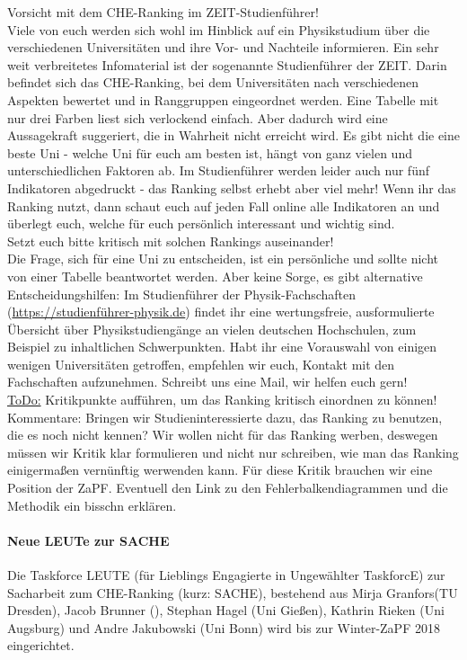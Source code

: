       Vorsicht mit dem CHE-Ranking im ZEIT-Studienführer! \\
      Viele von euch werden sich wohl im Hinblick auf ein Physikstudium über die verschiedenen Universitäten und ihre Vor- und Nachteile informieren. Ein sehr weit verbreitetes Infomaterial ist der sogenannte Studienführer der ZEIT. Darin befindet sich das CHE-Ranking, bei dem Universitäten nach verschiedenen Aspekten bewertet und in Ranggruppen eingeordnet werden.
      Eine Tabelle mit nur drei Farben liest sich verlockend einfach. Aber dadurch wird eine Aussagekraft suggeriert, die in Wahrheit nicht erreicht wird.
      Es gibt nicht die eine beste Uni -  welche Uni für euch am besten ist, hängt von ganz vielen und unterschiedlichen Faktoren ab.
      Im Studienführer werden leider auch nur fünf Indikatoren abgedruckt - das Ranking selbst erhebt aber viel mehr! Wenn ihr das Ranking nutzt, dann schaut euch auf jeden Fall online alle Indikatoren an und überlegt euch, welche für euch persönlich interessant und wichtig sind. \\

      Setzt euch bitte kritisch mit solchen Rankings auseinander! \\

      Die Frage, sich für eine Uni zu entscheiden, ist ein persönliche und sollte nicht von einer Tabelle beantwortet werden. Aber keine Sorge, es gibt alternative Entscheidungshilfen: Im Studienführer der Physik-Fachschaften (\url{https://studienführer-physik.de}) findet ihr eine wertungsfreie, ausformulierte Übersicht über Physikstudiengänge an vielen deutschen Hochschulen, zum Beispiel zu inhaltlichen Schwerpunkten.
      Habt ihr eine Vorauswahl von einigen wenigen Universitäten getroffen, empfehlen wir euch, Kontakt mit den Fachschaften aufzunehmen. Schreibt uns eine Mail, wir helfen euch gern! \\

      \underline{ToDo:} Kritikpunkte aufführen, um das Ranking kritisch einordnen zu können!
      Kommentare: Bringen wir Studieninteressierte dazu, das Ranking zu benutzen, die es noch nicht kennen?
      Wir wollen nicht für das Ranking werben, deswegen müssen wir Kritik klar formulieren und nicht nur schreiben, wie man das Ranking einigermaßen vernünftig werwenden kann. Für diese Kritik brauchen wir eine Position der ZaPF.
      Eventuell den Link zu den Fehlerbalkendiagrammen und die Methodik ein bisschn erklären.

    \paragraph{Neue LEUTe zur SACHE}
      Die Taskforce LEUTE (für Lieblings Engagierte in Ungewählter TaskforcE) zur Sacharbeit zum CHE-Ranking (kurz: SACHE), bestehend aus Mirja Granfors(TU Dresden), Jacob Brunner (), Stephan Hagel (Uni Gießen), Kathrin Rieken (Uni Augsburg) und Andre Jakubowski (Uni Bonn) wird bis zur Winter-ZaPF 2018 eingerichtet. \\

